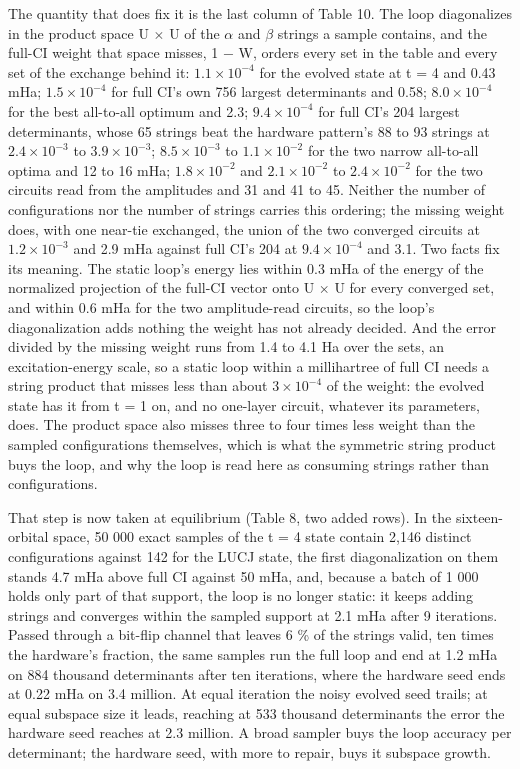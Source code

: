 \documentclass[11pt]{article}
\begin{document}
The quantity that does fix it is the last column of Table 10. The loop diagonalizes in the product space U $\times$ U of the $\alpha$ and $\beta$ strings a sample contains, and the full-CI weight that space misses, 1 $-$ W, orders every set in the table and every set of the exchange behind it: $1.1\times10^{-4}$ for the evolved state at t = 4 and 0.43 mHa; $1.5\times10^{-4}$ for full CI's own 756 largest determinants and 0.58; $8.0\times10^{-4}$ for the best all-to-all optimum and 2.3; $9.4\times10^{-4}$ for full CI's 204 largest determinants, whose 65 strings beat the hardware pattern's 88 to 93 strings at $2.4\times10^{-3}$ to $3.9\times10^{-3}$; $8.5\times10^{-3}$ to $1.1\times10^{-2}$ for the two narrow all-to-all optima and 12 to 16 mHa; $1.8\times10^{-2}$ and $2.1\times10^{-2}$ to $2.4\times10^{-2}$ for the two circuits read from the amplitudes and 31 and 41 to 45. Neither the number of configurations nor the number of strings carries this ordering; the missing weight does, with one near-tie exchanged, the union of the two converged circuits at $1.2\times10^{-3}$ and 2.9 mHa against full CI's 204 at $9.4\times10^{-4}$ and 3.1. Two facts fix its meaning. The static loop's energy lies within 0.3 mHa of the energy of the normalized projection of the full-CI vector onto U $\times$ U for every converged set, and within 0.6 mHa for the two amplitude-read circuits, so the loop's diagonalization adds nothing the weight has not already decided. And the error divided by the missing weight runs from 1.4 to 4.1 Ha over the sets, an excitation-energy scale, so a static loop within a millihartree of full CI needs a string product that misses less than about $3\times10^{-4}$ of the weight: the evolved state has it from t = 1 on, and no one-layer circuit, whatever its parameters, does. The product space also misses three to four times less weight than the sampled configurations themselves, which is what the symmetric string product buys the loop, and why the loop is read here as consuming strings rather than configurations.

That step is now taken at equilibrium (Table 8, two added rows). In the sixteen-orbital space, 50 000 exact samples of the t = 4 state contain 2,146 distinct configurations against 142 for the LUCJ state, the first diagonalization on them stands 4.7 mHa above full CI against 50 mHa, and, because a batch of 1 000 holds only part of that support, the loop is no longer static: it keeps adding strings and converges within the sampled support at 2.1 mHa after 9 iterations. Passed through a bit-flip channel that leaves 6 \% of the strings valid, ten times the hardware's fraction, the same samples run the full loop and end at 1.2 mHa on 884 thousand determinants after ten iterations, where the hardware seed ends at 0.22 mHa on 3.4 million. At equal iteration the noisy evolved seed trails; at equal subspace size it leads, reaching at 533 thousand determinants the error the hardware seed reaches at 2.3 million. A broad sampler buys the loop accuracy per determinant; the hardware seed, with more to repair, buys it subspace growth.
\end{document}
